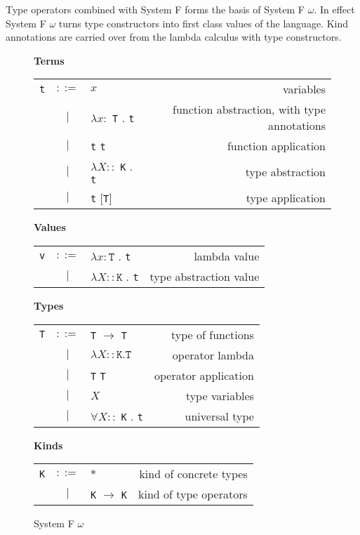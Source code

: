 Type operators combined with System F forms the basis of System F $\omega$.
In effect System F $\omega$ turns type constructors into first class values of
the language. Kind annotations are carried over from the lambda calculus with type
constructors.

\begin{figure}[H]\label{fig:systemfomega}
    \vspace{1cm}
    \textbf{Terms} \\
    \begin{tabular}{l c p{3cm} r}
        \texttt{t} & $ ::= $ & $ x $ &                   variables \\
      & $ | $ & $ \lambda x : $ \texttt{T} . \texttt{t} &          function abstraction, with type annotations \\
      & $ | $ & \texttt{t} \texttt{t} &          function application \\
      & $ | $ & $ \lambda X :: $ \texttt{K} . \texttt{t} &          type abstraction \\
      & $ | $ & \texttt{t} [\texttt{T}] &          type application \\
    \end{tabular}

    \vspace{1cm}
    \textbf{Values} \\
    \begin{tabular}{l c p{3cm} r}
        \texttt{v} & $ ::= $ & $ \lambda x : \texttt{T} $ . \texttt{t} &                   lambda value \\
         & $ | $ & $ \lambda X :: \texttt{K} $ . \texttt{t} &                   type abstraction value \\
    \end{tabular}

    \vspace{1cm}
    \textbf{Types} \\
    \begin{tabular}{l c p{3cm} r}
        \texttt{T} & $ ::= $ & \texttt{T} $ \rightarrow $ \texttt{T} &      type of functions \\
        & $ | $ & $ \lambda X :: \texttt{K} . \texttt{T} $ &            operator lambda \\
        & $ | $ & \texttt{T} \texttt{T} &                           operator application \\
        & $ | $ & $ X $ &       type variables \\
        & $ | $ & $ \forall X :: $ \texttt{K} . \texttt{t} &       universal type \\
    \end{tabular}

    \vspace{1cm}
    \textbf{Kinds} \\
    \begin{tabular}{l c p{3cm} r}
        \texttt{K} & $ ::= $ & $ * $ &      kind of concrete types \\
        & $ | $ & \texttt{K} $ \rightarrow $ \texttt{K} &            kind of type operators
    \end{tabular}

    \caption{System F $\omega$}
\end{figure}

